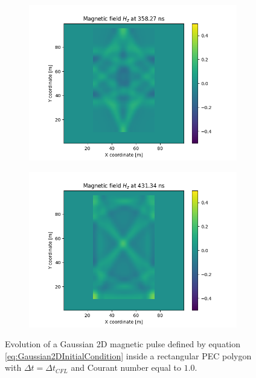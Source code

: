 \documentclass[12pt, oneside]{book}
\begin{document}
\begin{figure}[H]
    
    \begin{subfigure}[b]{0.49\textwidth}
        \centering
        \includegraphics[width=\textwidth]{Imagenes/CFDTD2D_GaussianStability5.png}
    \end{subfigure}
    \begin{subfigure}[b]{0.49\textwidth}
        \centering
        \includegraphics[width=\textwidth]{Imagenes/CFDTD2D_GaussianStability6.png}
    \end{subfigure}
    \caption{Evolution of a Gaussian 2D magnetic pulse defined by equation \ref{eq:Gaussian2DInitialCondition} inside a rectangular PEC polygon with $\Delta t = \Delta t_{CFL}$ and Courant number equal to $1.0$.}
    \label{fig:CFDTD2D_GaussianStability}
\end{figure}
\end{document}
